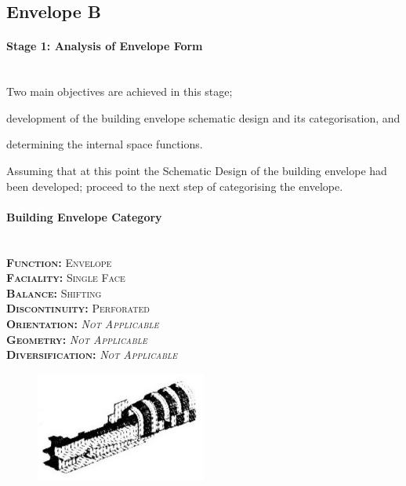 \clearpage
\subsection{Envelope B}

\paragraph{Stage 1: Analysis of Envelope Form}\mbox{}\\[2mm]

Two main objectives are achieved in this stage; \begin{inparaenum}[a)] \item development of the building envelope schematic design and its categorisation, and \item determining the internal space functions.\end{inparaenum}

Assuming that at this point the Schematic Design of the building envelope had been developed; proceed to the next step of categorising the envelope.

\setlength{\columnseprule}{0pt}
\begin{multicols}{2}
	\paragraph{Building Envelope Category}\mbox{}\\
	\vspace {0.5cm}	
	\small \textsc{\textbf{Function:} Envelope\\
	\vspace {0.3cm}
	\textbf{Faciality:} Single Face\\
	\vspace {0.3cm}
	\textbf{Balance:} Shifting\\
	\vspace {0.3cm}
	\textbf{Discontinuity:} Perforated\\
	\vspace {0.3cm}
	\textbf{Orientation:} \emph{Not Applicable}\\
	\vspace {0.3cm}
	\textbf{Geometry:} \emph{Not Applicable}\\
	\vspace {0.3cm}
	\textbf{Diversification:} \emph{Not Applicable}\\}
	\normalsize
	\columnbreak
	\vspace{4cm}
	\begin{figure}[H]
		\centering
		\includegraphics[width=0.5\textwidth]{./Images/13-Envelope4}
	\end{figure}
\end{multicols}
\vspace{-5mm}

